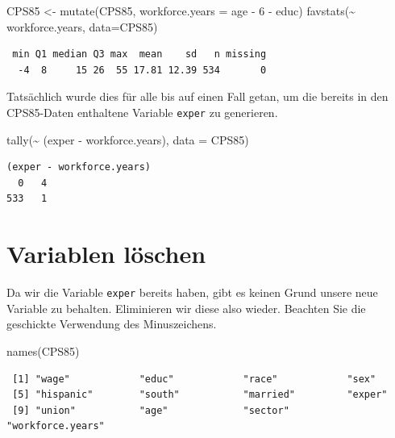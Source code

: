 \documentclass[
  ngerman,
]{scrbook}
\newenvironment{Shaded}{\begin{snugshade}}{\end{snugshade}}
\newcommand{\AttributeTok}[1]{\textcolor[rgb]{0.77,0.63,0.00}{#1}}
\newcommand{\DecValTok}[1]{\textcolor[rgb]{0.00,0.00,0.81}{#1}}
\newcommand{\FunctionTok}[1]{\textcolor[rgb]{0.00,0.00,0.00}{#1}}
\newcommand{\NormalTok}[1]{#1}
\newcommand{\OtherTok}[1]{\textcolor[rgb]{0.56,0.35,0.01}{#1}}
\newcommand{\SpecialCharTok}[1]{\textcolor[rgb]{0.00,0.00,0.00}{#1}}
\begin{document}
\begin{Shaded}
\begin{Highlighting}[]
\NormalTok{CPS85 }\OtherTok{\textless{}{-}} \FunctionTok{mutate}\NormalTok{(CPS85, }\AttributeTok{workforce.years =}\NormalTok{ age }\SpecialCharTok{{-}} \DecValTok{6} \SpecialCharTok{{-}}\NormalTok{ educ)}
\FunctionTok{favstats}\NormalTok{(}\SpecialCharTok{\textasciitilde{}}\NormalTok{ workforce.years, }\AttributeTok{data=}\NormalTok{CPS85)}
\end{Highlighting}
\end{Shaded}

\begin{verbatim}
 min Q1 median Q3 max  mean    sd   n missing
  -4  8     15 26  55 17.81 12.39 534       0
\end{verbatim}

Tatsächlich wurde dies für alle bis auf einen Fall getan, um die bereits in den \textsc{CPS85}-Daten enthaltene Variable \texttt{exper} zu generieren.

\begin{Shaded}
\begin{Highlighting}[]
\FunctionTok{tally}\NormalTok{(}\SpecialCharTok{\textasciitilde{}}\NormalTok{ (exper }\SpecialCharTok{{-}}\NormalTok{ workforce.years), }\AttributeTok{data =}\NormalTok{ CPS85)}
\end{Highlighting}
\end{Shaded}

\begin{verbatim}
(exper - workforce.years)
  0   4 
533   1 
\end{verbatim}

\hypertarget{variablen-luxf6schen}{%
\section{Variablen löschen}\label{variablen-luxf6schen}}

Da wir die Variable \texttt{exper} bereits haben, gibt es keinen Grund unsere neue Variable zu behalten. Eliminieren wir diese also wieder. Beachten Sie die geschickte Verwendung des Minuszeichens.

\begin{Shaded}
\begin{Highlighting}[]
\FunctionTok{names}\NormalTok{(CPS85)}
\end{Highlighting}
\end{Shaded}

\begin{verbatim}
 [1] "wage"            "educ"            "race"            "sex"            
 [5] "hispanic"        "south"           "married"         "exper"          
 [9] "union"           "age"             "sector"          "workforce.years"
\end{verbatim}
\end{document}
